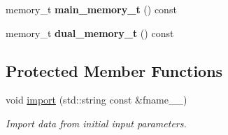 \begin{DoxyCompactItemize}
\item 
\hypertarget{classsirius_1_1_simulation__parameters_a2740424efe7693569bcb3dfa677be441}{}memory\+\_\+t {\bfseries main\+\_\+memory\+\_\+t} () const \label{classsirius_1_1_simulation__parameters_a2740424efe7693569bcb3dfa677be441}

\item 
\hypertarget{classsirius_1_1_simulation__parameters_a9fe466c67d1a58d9a4e82ab3f57fba3d}{}memory\+\_\+t {\bfseries dual\+\_\+memory\+\_\+t} () const \label{classsirius_1_1_simulation__parameters_a9fe466c67d1a58d9a4e82ab3f57fba3d}

\end{DoxyCompactItemize}
\subsection*{Protected Member Functions}
\begin{DoxyCompactItemize}
\item 
void \hyperlink{classsirius_1_1_simulation__parameters_af3e24a47d7bf3bfbb14ae113ec10d95a}{import} (std\+::string const \&fname\+\_\+\+\_\+)
\begin{DoxyCompactList}\small\item\em Import data from initial input parameters. \end{DoxyCompactList}\end{DoxyCompactItemize}
